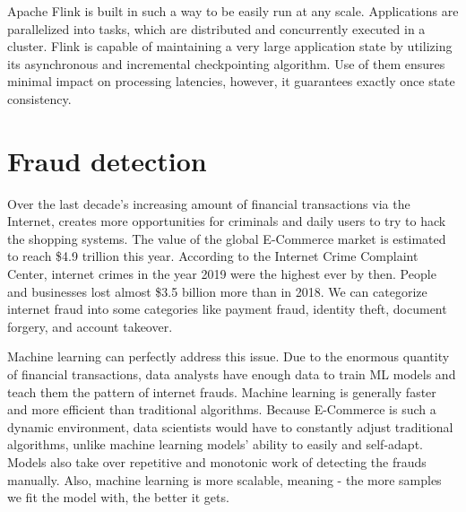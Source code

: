 Apache Flink is built in such a way to be easily run at any scale. Applications are parallelized into tasks,
which are distributed and concurrently executed in a cluster.
Flink is capable of maintaining a very large application state by utilizing its asynchronous and incremental checkpointing algorithm.
Use of them ensures minimal impact on processing latencies, however, it guarantees exactly once state consistency.\cite{flink}

\section{Fraud detection}

Over the last decade's increasing amount of financial transactions via the Internet, creates more opportunities for
criminals and daily users to try to hack the shopping systems.
The value of the global E-Commerce market is estimated to reach \$4.9 trillion this year.
According to the Internet Crime Complaint Center, internet crimes in the year 2019 were the highest ever by then.
People and businesses lost almost \$3.5 billion more than in 2018. We can categorize internet fraud
into some categories like payment fraud, identity theft, document forgery, and account takeover.

Machine learning can perfectly address this issue. Due to the enormous quantity of financial transactions,
data analysts have enough data to train ML models and teach them the pattern of internet frauds.
Machine learning is generally faster and more efficient than traditional algorithms.
Because E-Commerce is such a dynamic environment, data scientists would have to constantly adjust traditional
algorithms, unlike machine learning models' ability to easily and self-adapt.
Models also take over repetitive and monotonic work of detecting the frauds manually.
Also, machine learning is more scalable, meaning - the more samples we fit the model with, the better it gets.\cite{frauds}
